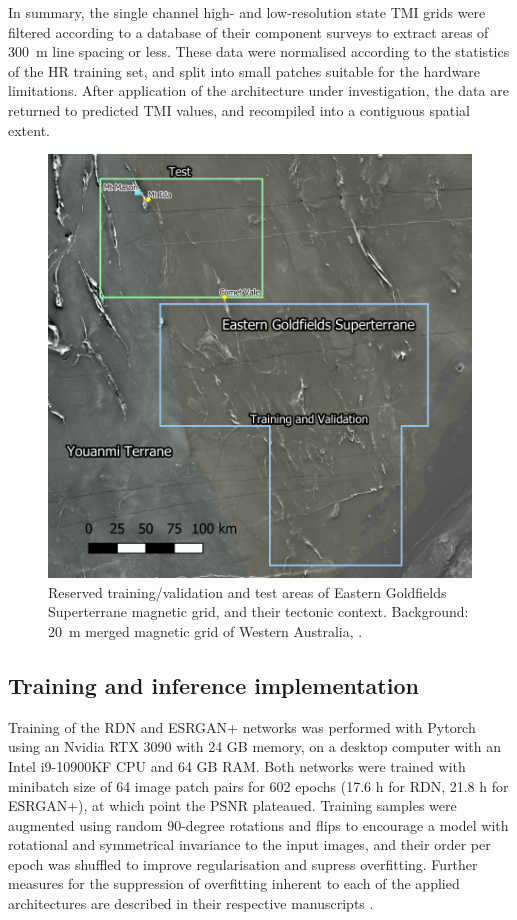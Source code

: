 In summary, the single channel high- and low-resolution state TMI grids were filtered according to a database of their component surveys to extract areas of \qty{300}{\metre} line spacing or less.
These data were normalised according to the statistics of the HR training set, and split into small patches suitable for the hardware limitations.
After application of the architecture under investigation, the data are returned to predicted TMI values, and recompiled into a contiguous spatial extent.

\begin{figure}[hbtp]
    \centering
    \includegraphics[width=0.75\linewidth]{fig/p1/trainvaldata.png}
    \caption[Dataset context]{Reserved training/validation and test areas of Eastern Goldfields Superterrane magnetic grid, and their tectonic context.
        Background: \qty{20}{\metre} merged magnetic grid of Western Australia, \parencite{brett40MagneticMerged2020}.
    }
    \label{fig:trainvaldata}
\end{figure}

\subsection{Training and inference implementation}
Training of the RDN\textdaggerdbl{} and ESRGAN+ networks was performed with Pytorch \parencite{paszkePyTorchImperativeStyle2019} using an Nvidia RTX 3090 with 24 GB memory, on a desktop computer with an Intel i9-10900KF CPU and 64 GB RAM\@.
Both networks were trained with minibatch size of 64 image patch pairs for \num{602} epochs (\num{17.6} h for RDN\textdaggerdbl{}, \num{21.8} h for ESRGAN+), at which point the PSNR plateaued.
Training samples were augmented using random 90-degree rotations and flips to encourage a model with rotational and symmetrical invariance to the input images, and their order per epoch was shuffled to improve regularisation and supress overfitting.
Further measures for the suppression of overfitting inherent to each of the applied architectures are described in their respective manuscripts \parencite{wangESRGANEnhancedSuperresolution2018,zhangResidualDenseNetwork2018}.

